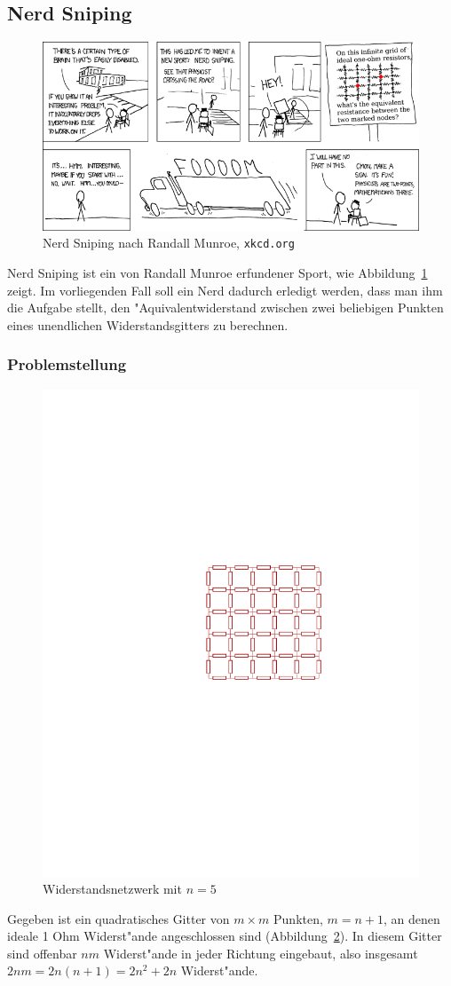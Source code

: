\subsection{Nerd Sniping}
\begin{figure}
\begin{center}
\includegraphics[width=\hsize]{applications/nerdsniping}
\end{center}
\caption{Nerd Sniping nach Randall Munroe, {\tt xkcd.org}\label{nerdsniping}}
\end{figure}
Nerd Sniping ist ein von Randall Munroe erfundener Sport, wie
Abbildung~\ref{nerdsniping} zeigt. Im vorliegenden Fall soll
ein Nerd dadurch erledigt werden, dass man ihm die Aufgabe
stellt, den "Aquivalentwiderstand zwischen zwei beliebigen
Punkten eines unendlichen Widerstandsgitters zu berechnen.

\subsubsection{Problemstellung}
\begin{figure}
\begin{center}
\includegraphics[width=0.6\hsize]{applications/grid}
\end{center}
\caption{Widerstandsnetzwerk mit $n=5$\label{grid}}
\end{figure}
Gegeben ist ein quadratisches Gitter von $m\times m$ Punkten,
$m = n+1$, an denen ideale 1 Ohm Widerst"ande angeschlossen sind
(Abbildung~\ref{grid}).
In diesem Gitter sind offenbar $nm$ Widerst"ande in jeder Richtung
eingebaut, also insgesamt $2nm=2n(n+1)=2n^2+2n$ Widerst"ande.

